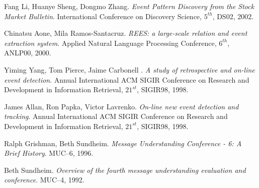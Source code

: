 \begin{thebibliography}{99}
		 Fang Li, Huanye Sheng, Dongmo Zhang. \emph{Event Pattern Discovery from the Stock Market Bulletin}. International Conference on Discovery Science, $5^{th}$, DS02, 2002.

		 Chinatsu Aone, Mila Ramos-Santacruz. \emph{REES: a large-scale relation and event extraction system}. Applied Natural Language Processing Conference, $6^{th}$, ANLP00, 2000.

		 	Yiming Yang, Tom Pierce, Jaime Carbonell 	. \emph{A study of retrospective and on-line event detection}.  Annual International ACM SIGIR Conference on Research and Development in Information Retrieval, $21^{st}$, SIGIR98, 1998. 
		
		 James Allan, Ron Papka, Victor Lavrenko. \emph{On-line new event detection and tracking}.  Annual International ACM SIGIR Conference on Research and Development in Information Retrieval, $21^{st}$, SIGIR98, 1998.  	

		 Ralph Grishman, Beth Sundheim. \emph{Message Understanding Conference - 6: A Brief History}. MUC--6, 1996.

		Beth Sundheim. \emph{Overview of the fourth message understanding evaluation and conference}. MUC--4, 1992.
%
	
\end{thebibliography}
